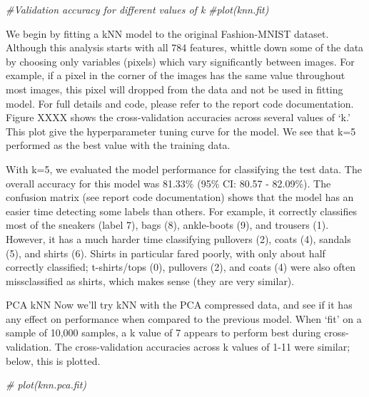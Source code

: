 \documentclass{article}
\newenvironment{Shaded}{\begin{snugshade}}{\end{snugshade}}
\newcommand{\CommentTok}[1]{\textcolor[rgb]{0.56,0.35,0.01}{\textit{#1}}}
\begin{document}
\begin{Shaded}
\begin{Highlighting}[]
\CommentTok{\#Validation accuracy for different values of k }
\CommentTok{\#plot(knn.fit)}
\end{Highlighting}
\end{Shaded}

We begin by fitting a kNN model to the original Fashion-MNIST dataset.
Although this analysis starts with all 784 features, whittle down some
of the data by choosing only variables (pixels) which vary significantly
between images. For example, if a pixel in the corner of the images has
the same value throughout most images, this pixel will dropped from the
data and not be used in fitting model. For full details and code, please
refer to the report code documentation. Figure XXXX shows the
cross-validation accuracies across several values of `k.' This plot give
the hyperparameter tuning curve for the model. We see that k=5 performed
as the best value with the training data.

With k=5, we evaluated the model performance for classifying the test
data. The overall accuracy for this model was 81.33\% (95\% CI: 80.57 -
82.09\%). The confusion matrix (see report code documentation) shows
that the model has an easier time detecting some labels than others. For
example, it correctly classifies most of the sneakers (label 7), bags
(8), ankle-boots (9), and trousers (1). However, it has a much harder
time classifying pullovers (2), coats (4), sandals (5), and shirts (6).
Shirts in particular fared poorly, with only about half correctly
classified; t-shirts/tops (0), pullovers (2), and coats (4) were also
often missclassified as shirts, which makes sense (they are very
similar).

PCA kNN Now we'll try kNN with the PCA compressed data, and see if it
has any effect on performance when compared to the previous model. When
`fit' on a sample of 10,000 samples, a k value of 7 appears to perform
best during cross-validation. The cross-validation accuracies across k
values of 1-11 were similar; below, this is plotted.

\begin{Shaded}
\begin{Highlighting}[]
\CommentTok{\# plot(knn.pca.fit)}
\end{Highlighting}
\end{Shaded}
\end{document}
